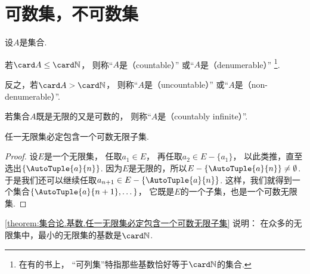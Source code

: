 
\section{可数集，不可数集}
\begin{definition}
设\(A\)是集合.

若\(
	\card A \leq \card\mathbb{N}
\)，
则称“\(A\)是（countable）”
或“\(A\)是（denumerable）”
\footnote{
	在有的书上，
	“可列集”特指那些基数恰好等于\(\card\mathbb{N}\)的集合.
}.

反之，若\(
	\card A > \card\mathbb{N}
\)，
则称“\(A\)是（uncountable）”
或“\(A\)是（non-denumerable）”.
\end{definition}

\begin{definition}
若集合\(A\)既是无限的又是可数的，
则称“\(A\)是（countably infinite）”.
\end{definition}

\begin{theorem}\label{theorem:集合论.基数.任一无限集必定包含一个可数无限子集}
任一无限集必定包含一个可数无限子集.
\begin{proof}
设\(E\)是一个无限集，
任取\(a_1 \in E\)，
再任取\(a_2 \in E-\{a_1\}\)，
以此类推，直至选出\(\{\AutoTuple{a}{n}\}\).
因为\(E\)是无限的，所以\(E-\{\AutoTuple{a}{n}\}\neq\emptyset\).
于是我们还可以继续任取\(a_{n+1} \in E-\{\AutoTuple{a}{n}\}\).
这样，我们就得到一个集合\(\{\AutoTuple{a}{n+1},\dotsc\}\)，
它既是\(E\)的一个子集，也是一个可数无限集.
\end{proof}
\end{theorem}
\begin{remark}
\cref{theorem:集合论.基数.任一无限集必定包含一个可数无限子集} 说明：
在众多的无限集中，最小的无限集的基数是\(\card\mathbb{N}\).
\end{remark}

